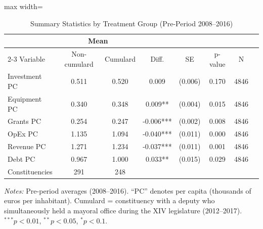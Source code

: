 \begin{table}[htbp]
\centering
\caption{Summary Statistics by Treatment Group (Pre-Period 2008--2016)}
\label{tab:summary}
\begin{adjustbox}{max width=\textwidth}
\begin{tabular}{lccccccc}
\hline\hline
 & \multicolumn{2}{c}{Mean} & & & & \\
\cline{2-3}
Variable & Non-cumulard & Cumulard & Diff. & SE & p-value & N \\
\hline
Investment PC & 0.511 & 0.520 & 0.009 & (0.006) & 0.170 & 4846 \\
Equipment PC & 0.340 & 0.348 & 0.009** & (0.004) & 0.015 & 4846 \\
Grants PC & 0.254 & 0.247 & -0.006*** & (0.002) & 0.008 & 4846 \\
OpEx PC & 1.135 & 1.094 & -0.040*** & (0.011) & 0.000 & 4846 \\
Revenue PC & 1.271 & 1.234 & -0.037*** & (0.011) & 0.001 & 4846 \\
Debt PC & 0.967 & 1.000 & 0.033** & (0.015) & 0.029 & 4846 \\
\hline
Constituencies &  291  &  248  & & & & \\
\hline\hline
\end{tabular}
\end{adjustbox}
\parbox{\textwidth}{\footnotesize \textit{Notes:} Pre-period averages (2008--2016). ``PC'' denotes per capita (thousands of euros per inhabitant). Cumulard = constituency with a deputy who simultaneously held a mayoral office during the XIV legislature (2012--2017). $^{***}p<0.01$, $^{**}p<0.05$, $^{*}p<0.1$.}
\end{table}
